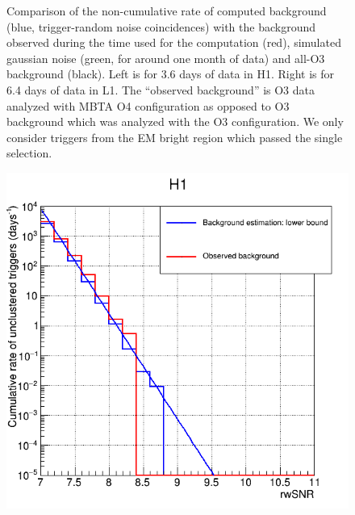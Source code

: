 \begin{figure}
\begin{minipage}{0.45\linewidth}
  \end{minipage}
  \caption{Comparison of the non-cumulative rate of computed background (blue, trigger-random noise coincidences) with the background observed during the time used for the computation (red), simulated gaussian noise (green, for around one month of data) and all-O3 background (black).
    Left is for 3.6 days of data in H1.
    Right is for 6.4 days of data in L1.
    The ``observed background'' is O3 data analyzed with MBTA O4 configuration as opposed to O3 background which was analyzed with the O3 configuration.
    We only consider triggers from the EM bright region which passed the single selection.}
  \label{fig:computed_bkg}
\end{figure}


\begin{figure}
  \centering
  \begin{minipage}{0.45\linewidth}
    \includegraphics[width=\linewidth]{sectionFAR/O4/cRateCompCumulH1_380000.png}
  \end{minipage}
  \begin{minipage}{0.45\linewidth}

\end{minipage}
\end{figure}
